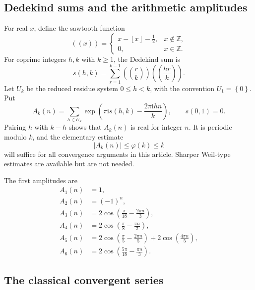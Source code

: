 \documentclass[11pt]{article}
\numberwithin{equation}{section}
\theoremstyle{mainthm}
\theoremstyle{defstyle}
\theoremstyle{remark}
\newcommand{\ii}{\mathrm i}
\newcommand{\set}[1]{\left\{#1\right\}}
\newcommand{\floor}[1]{\left\lfloor#1\right\rfloor}
\begin{document}
\subsection{Dedekind sums and the arithmetic amplitudes}

For real \(x\), define the sawtooth function
\begin{equation}\label{eq:sawtooth}
 ((x))=\begin{cases}
 x-\floor{x}-\frac12,&x\notin\mathbb Z,\\
 0,&x\in\mathbb Z.
 \end{cases}
\end{equation}
For coprime integers \(h,k\) with \(k\ge1\), the Dedekind sum is
\begin{equation}\label{eq:dedekind-sum}
 s(h,k)=\sum_{r=1}^{k-1}\left(\left(\frac rk\right)\right)
                         \left(\left(\frac{hr}{k}\right)\right).
\end{equation}
Let \(U_k\) be the reduced residue system \(0\le h<k\), with the convention \(U_1=\set{0}\).  Put
\begin{equation}\label{eq:Ak-def}
 A_k(n)=\sum_{h\in U_k}
 \exp\!\left(\pi\ii s(h,k)-\frac{2\pi\ii hn}{k}\right),
 \qquad s(0,1)=0.
\end{equation}
Pairing \(h\) with \(k-h\) shows that \(A_k(n)\) is real for integer \(n\).  It is periodic modulo \(k\), and the elementary estimate
\begin{equation}\label{eq:Ak-trivial-bound}
 |A_k(n)|\le\varphi(k)\le k
\end{equation}
will suffice for all convergence arguments in this article.  Sharper Weil-type estimates are available but are not needed.

The first amplitudes are
\begin{align}
 A_1(n)&=1,\nonumber\\
 A_2(n)&=(-1)^n,\nonumber\\
 A_3(n)&=2\cos\left(\frac\pi{18}-\frac{2\pi n}{3}\right),\nonumber\\
 A_4(n)&=2\cos\left(\frac\pi8-\frac{\pi n}{2}\right),\label{eq:small-Ak}\\
 A_5(n)&=2\cos\left(\frac\pi5-\frac{2\pi n}{5}\right)
        +2\cos\left(\frac{4\pi n}{5}\right),\nonumber\\
 A_6(n)&=2\cos\left(\frac{5\pi}{18}-\frac{\pi n}{3}\right).\nonumber
\end{align}

\subsection{The classical convergent series}
\end{document}
